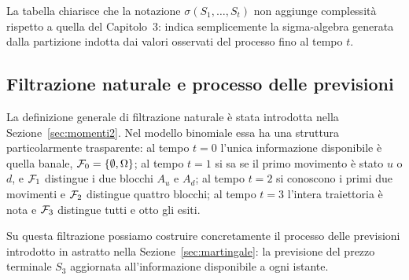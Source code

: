 \noindent
La tabella chiarisce che la notazione $\sigma(S_1,\ldots,S_t)$ non
aggiunge complessit\`{a} rispetto a quella del Capitolo~3: indica
semplicemente la sigma-algebra generata dalla partizione indotta dai
valori osservati del processo fino al tempo $t$.

\subsection{Filtrazione naturale e processo delle previsioni}

\noindent
La definizione generale di filtrazione naturale \`{e} stata introdotta
nella Sezione~\ref{sec:momenti2}. Nel modello binomiale essa ha una
struttura particolarmente trasparente: al tempo $t=0$ l'unica
informazione disponibile \`{e} quella banale, $\mathcal{F}_0=\{\emptyset,
\Omega\}$; al tempo $t=1$ si sa se il primo movimento \`{e} stato $u$
o $d$, e $\mathcal{F}_1$ distingue i due blocchi $A_u$ e $A_d$; al tempo $t=2$
si conoscono i primi due movimenti e $\mathcal{F}_2$ distingue quattro blocchi;
al tempo $t=3$ l'intera traiettoria \`{e} nota e $\mathcal{F}_3$ distingue
tutti e otto gli esiti.

Su questa filtrazione possiamo costruire concretamente il processo
delle previsioni introdotto in astratto nella
Sezione~\ref{sec:martingale}: la previsione del prezzo terminale
$S_3$ aggiornata all'informazione disponibile a ogni istante.

